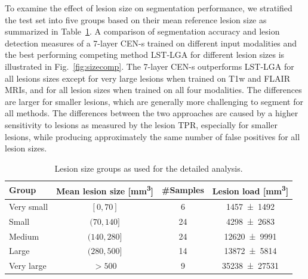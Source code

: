 
To examine the effect of lesion size on segmentation performance, we stratified
the test set into five groups based on their mean reference lesion size as
summarized in Table~\ref{tab:groups}. A comparison of segmentation accuracy and
lesion detection measures of a 7-layer CEN-s trained on different input
modalities and the best performing competing method LST-LGA for different lesion
sizes is illustrated in Fig.~\ref{fig:sizecomp}. The 7-layer CEN-s outperforms
LST-LGA for all lesions sizes except for very large lesions when trained on T1w
and FLAIR MRIs, and for all lesion sizes when trained on all four modalities.
The differences are larger for smaller lesions, which are generally more
challenging to segment for all methods. The differences between the two
approaches are caused by a higher sensitivity to lesions as measured by the
lesion TPR, especially for smaller lesions, while producing approximately the
same number of false positives for all lesion sizes.



\begin{table}[tb]
\caption{Lesion size groups as used for the detailed analysis.}
\label{tab:groups}
\centering
\begin{tabular}{@{}lccc@{}}
\toprule
Group & Mean lesion size [\si{\cubic\milli\metre}] & \#Samples & Lesion
load [\si{\cubic\milli\metre}] \\
\midrule
Very small & $[0,70]$ & 6 & \num{1457+-1492} \\
Small      & $(70,140]$ & 24 & \num{4298+-2683} \\
Medium & $(140,280]$ & 24 & \num{12620+-9991} \\
Large & $(280,500]$ & 14 & \num{13872+-5814} \\
Very large & $> 500$ & 9 & \num{35238+-27531} \\
\bottomrule
\end{tabular}
\end{table}

